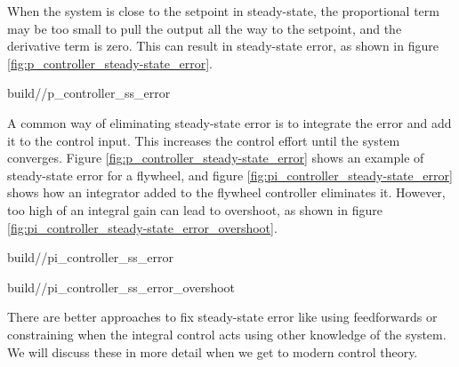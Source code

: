 When the \gls{system} is close to the \gls{setpoint} in steady-state, the
proportional term may be too small to pull the \gls{output} all the way to the
\gls{setpoint}, and the derivative term is zero. This can result in
\gls{steady-state error}, as shown in figure
\ref{fig:p_controller_steady-state_error}.
\begin{svg}{build/\chapterpath/p_controller_ss_error}
  \caption{P controller on a flywheel with steady-state error}
  \label{fig:p_controller_steady-state_error}
\end{svg}

A common way of eliminating \gls{steady-state error} is to integrate the
\gls{error} and add it to the \gls{control input}. This increases the
\gls{control effort} until the \gls{system} converges. Figure
\ref{fig:p_controller_steady-state_error} shows an example of
\gls{steady-state error} for a flywheel, and figure
\ref{fig:pi_controller_steady-state_error} shows how an integrator added to the
flywheel controller eliminates it. However, too high of an integral gain can
lead to overshoot, as shown in figure
\ref{fig:pi_controller_steady-state_error_overshoot}.
\begin{bookfigure}
  \begin{minisvg}{2}{build/\chapterpath/pi_controller_ss_error}
    \caption{PI controller on a flywheel without steady-state error}
    \label{fig:pi_controller_steady-state_error}
  \end{minisvg}
  \hfill
  \begin{minisvg}{2}{build/\chapterpath/pi_controller_ss_error_overshoot}
    \caption{PI controller on a flywheel with overshoot from large $K_i$ gain}
    \label{fig:pi_controller_steady-state_error_overshoot}
  \end{minisvg}
\end{bookfigure}
\begin{remark}
  There are better approaches to fix \gls{steady-state error} like using
  feedforwards or constraining when the integral control acts using other
  knowledge of the \gls{system}. We will discuss these in more detail when we
  get to modern control theory.
\end{remark}
